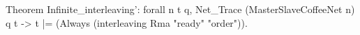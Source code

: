 Theorem Infinite_interleaving':
  forall n t q,
   Net_Trace (MasterSlaveCoffeeNet n) q t ->
   t |= (Always (interleaving Rma "ready" "order")).